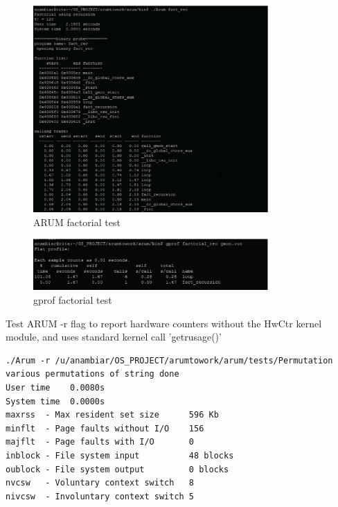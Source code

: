 \documentclass[11pt,letterpaper,oneside]{article}
\begin{document}
\begin{figure}
\begin{center}
\includegraphics[width=0.8\textwidth]{arumfacttest.eps}
\caption{ARUM factorial test}
\label{fig:arumfact}
\end{center}
\end{figure}

\begin{figure}
\begin{center}
\includegraphics[width=0.8\textwidth]{gproffacttest.eps}
\caption{gprof factorial test}
\label{fig:gproffact}
\end{center}
\end{figure}

Test ARUM -r flag to report hardware counters without the HwCtr kernel module, and uses standard kernel call 'getrusage()' 

\begin{verbatim}
./Arum -r /u/anambiar/OS_PROJECT/arumtowork/arum/tests/Permutation
various permutations of string done
User time    0.0080s
System time  0.0000s
maxrss  - Max resident set size      596 Kb
minflt  - Page faults without I/O    156
majflt  - Page faults with I/O       0
inblock - File system input          48 blocks
oublock - File system output         0 blocks
nvcsw   - Voluntary context switch   8
nivcsw  - Involuntary context switch 5

\end{verbatim}
\end{document}
